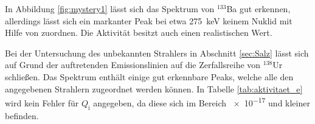 In Abbildung \ref{fig:mystery1} lässt sich das Spektrum von 
${}^{133}$Ba gut erkennen, allerdings lässt sich ein markanter 
Peak bei etwa \SI{275}{\kilo\electronvolt} keinem Nuklid 
mit Hilfe von \cite{referenz1} zuordnen. Die Aktivität besitzt auch
einen realistischen Wert.

Bei der Untersuchung des unbekannten Strahlers in Abschnitt \ref{sec:Salz}
lässt sich auf Grund der auftretenden Emissionslinien auf die Zerfallsreihe
von ${}^{138}$Ur schließen. Das Spektrum enthält einige gut erkennbare
Peaks, welche alle den angegebenen Strahlern zugeordnet werden können.
In Tabelle \ref{tab:aktivitaet_e} wird kein Fehler für $Q_\text{i}$
angegeben, da diese sich im Bereich \num{e-17} und kleiner befinden.